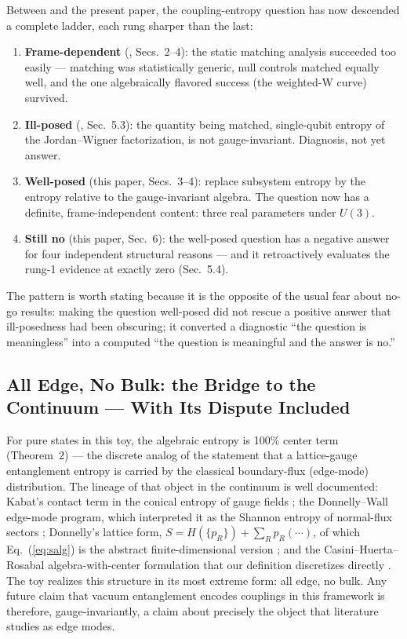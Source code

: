 \documentclass[11pt]{article}
\begin{document}
Between \cite{companion} and the present paper, the coupling-entropy question has now descended a complete ladder, each rung sharper than the last:

\begin{enumerate}
\item \textbf{Frame-dependent} (\cite{companion}, Secs.~2--4): the static matching analysis succeeded too easily --- matching was statistically generic, null controls matched equally well, and the one algebraically flavored success (the weighted-W curve) survived.
\item \textbf{Ill-posed} (\cite{companion}, Sec.~5.3): the quantity being matched, single-qubit entropy of the Jordan--Wigner factorization, is not gauge-invariant. Diagnosis, not yet answer.
\item \textbf{Well-posed} (this paper, Secs.~3--4): replace subsystem entropy by the entropy relative to the gauge-invariant algebra. The question now has a definite, frame-independent content: three real parameters under $U(3)$.
\item \textbf{Still no} (this paper, Sec.~6): the well-posed question has a negative answer for four independent structural reasons --- and it retroactively evaluates the rung-1 evidence at exactly zero (Sec.~5.4).
\end{enumerate}

The pattern is worth stating because it is the opposite of the usual fear about no-go results: making the question well-posed did not rescue a positive answer that ill-posedness had been obscuring; it converted a diagnostic ``the question is meaningless'' into a computed ``the question is meaningful and the answer is no.''

\subsection{All Edge, No Bulk: the Bridge to the Continuum --- With Its Dispute Included}

For pure states in this toy, the algebraic entropy is 100\% center term (Theorem~2) --- the discrete analog of the statement that a lattice-gauge entanglement entropy is carried by the classical boundary-flux (edge-mode) distribution. The lineage of that object in the continuum is well documented: Kabat's contact term in the conical entropy of gauge fields \cite{kabat}; the Donnelly--Wall edge-mode program, which interpreted it as the Shannon entropy of normal-flux sectors \cite{dw15, dw16}; Donnelly's lattice form, $S = H(\{p_R\}) + \sum_R p_R(\cdots)$, of which Eq.~(\ref{eq:salg}) is the abstract finite-dimensional version \cite{donnelly12, donnelly14}; and the Casini--Huerta--Rosabal algebra-with-center formulation that our definition discretizes directly \cite{chr}. The toy realizes this structure in its most extreme form: all edge, no bulk. Any future claim that vacuum entanglement encodes couplings in this framework is therefore, gauge-invariantly, a claim about precisely the object that literature studies as edge modes.
\end{document}
